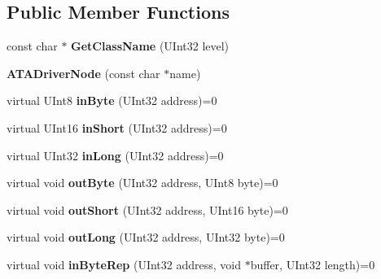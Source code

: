 \subsection*{Public Member Functions}
\begin{DoxyCompactItemize}
\item 
\mbox{\label{class_a_t_a_driver_node_a62e908c3ad6855e40a9e3f922ebd49d4}} 
const char $\ast$ {\bfseries Get\+Class\+Name} (U\+Int32 level)
\item 
\mbox{\label{class_a_t_a_driver_node_ac79dac66865a1b0ac13ea55d0b99f1c3}} 
{\bfseries A\+T\+A\+Driver\+Node} (const char $\ast$name)
\item 
\mbox{\label{class_a_t_a_driver_node_a2022fc6685c72d9580a1afa878470cda}} 
virtual U\+Int8 {\bfseries in\+Byte} (U\+Int32 address)=0
\item 
\mbox{\label{class_a_t_a_driver_node_a3edab33f667a6033e93f1a627e5b54cc}} 
virtual U\+Int16 {\bfseries in\+Short} (U\+Int32 address)=0
\item 
\mbox{\label{class_a_t_a_driver_node_afb23a527dfddffab2773cbca507bdf95}} 
virtual U\+Int32 {\bfseries in\+Long} (U\+Int32 address)=0
\item 
\mbox{\label{class_a_t_a_driver_node_aceea9742a57fe02bebace6822330fec1}} 
virtual void {\bfseries out\+Byte} (U\+Int32 address, U\+Int8 byte)=0
\item 
\mbox{\label{class_a_t_a_driver_node_ae3f04adeed8ec66ec0a335c53245dec4}} 
virtual void {\bfseries out\+Short} (U\+Int32 address, U\+Int16 byte)=0
\item 
\mbox{\label{class_a_t_a_driver_node_a336a09330409830b3e22e9d2216f7543}} 
virtual void {\bfseries out\+Long} (U\+Int32 address, U\+Int32 byte)=0
\item 
\mbox{\label{class_a_t_a_driver_node_a83481a2921bdd71dcd86fb97fd870d17}} 
virtual void {\bfseries in\+Byte\+Rep} (U\+Int32 address, void $\ast$buffer, U\+Int32 length)=0

\end{DoxyCompactItemize}
